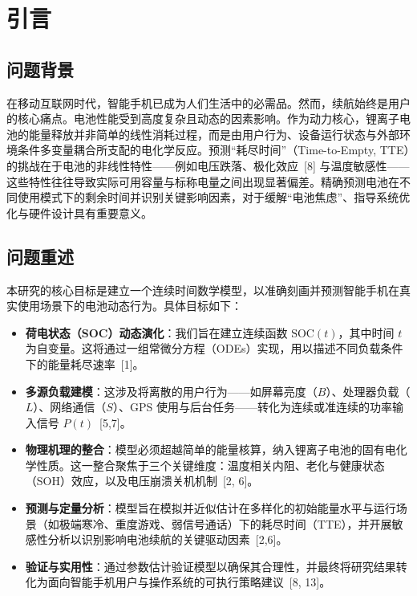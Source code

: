 \documentclass[11pt,a4paper]{ctexart}
\begin{document}
\newpage
\section{引言}

\subsection{问题背景}

在移动互联网时代，智能手机已成为人们生活中的必需品。然而，续航始终是用户的核心痛点。电池性能受到高度复杂且动态的因素影响。作为动力核心，锂离子电池的能量释放并非简单的线性消耗过程，而是由用户行为、设备运行状态与外部环境条件多变量耦合所支配的电化学反应。预测“耗尽时间”（Time-to-Empty, TTE）的挑战在于电池的非线性特性——例如电压跌落、极化效应~[8] 与温度敏感性——这些特性往往导致实际可用容量与标称电量之间出现显著偏差。精确预测电池在不同使用模式下的剩余时间并识别关键影响因素，对于缓解“电池焦虑”、指导系统优化与硬件设计具有重要意义。

\subsection{问题重述}

本研究的核心目标是建立一个连续时间数学模型，以准确刻画并预测智能手机在真实使用场景下的电池动态行为。具体目标如下：

\begin{itemize}
\item \textbf{荷电状态（SOC）动态演化}：我们旨在建立连续函数 $\mathrm{SOC}(t)$，其中时间 $t$ 为自变量。这将通过一组常微分方程（ODEs）实现，用以描述不同负载条件下的能量耗尽速率~[1]。
\item \textbf{多源负载建模}：这涉及将离散的用户行为——如屏幕亮度（$B$）、处理器负载（$L$）、网络通信（$S$）、GPS 使用与后台任务——转化为连续或准连续的功率输入信号 $P(t)$~[5,7]。
\item \textbf{物理机理的整合}：模型必须超越简单的能量核算，纳入锂离子电池的固有电化学性质。这一整合聚焦于三个关键维度：温度相关内阻、老化与健康状态（SOH）效应，以及电压崩溃关机机制~[2, 6]。
\item \textbf{预测与定量分析}：模型旨在模拟并近似估计在多样化的初始能量水平与运行场景（如极端寒冷、重度游戏、弱信号通话）下的耗尽时间（TTE），并开展敏感性分析以识别影响电池续航的关键驱动因素~[2,6]。
\item \textbf{验证与实用性}：通过参数估计验证模型以确保其合理性，并最终将研究结果转化为面向智能手机用户与操作系统的可执行策略建议~[8, 13]。
\end{itemize}
\end{document}
